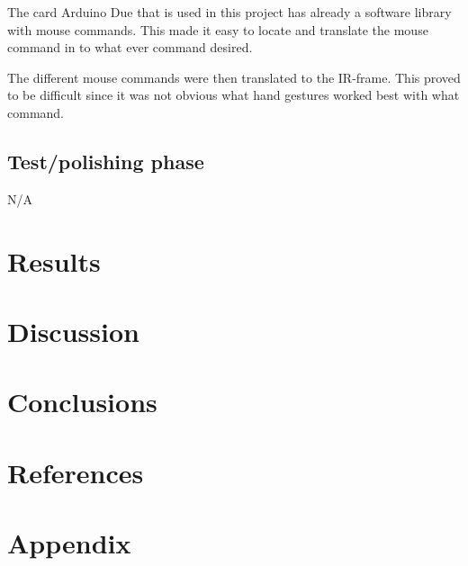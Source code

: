 \documentclass[a4paper,11pt]{article}
\begin{document}
The card Arduino Due that is used in this project has already a software library 
with mouse commands. This made it easy to locate and translate the mouse command in to
what ever command desired.

The different mouse commands were then translated to the IR-frame. This proved to be 
difficult since it was not obvious what hand gestures worked best with what command. 

\subsection{Test/polishing phase}
N/A
\newpage
\section{Results}

\newpage
\section{Discussion}

\newpage
\section{Conclusions}

\newpage
\section{References}

\newpage
\appendix
\section{Appendix}
\end{document}

